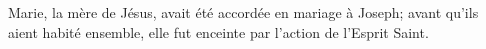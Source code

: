 Marie, la mère de Jésus, avait été accordée en mariage à Joseph;
	avant qu’ils aient habité ensemble,
	elle fut enceinte par l’action de l’Esprit Saint.
